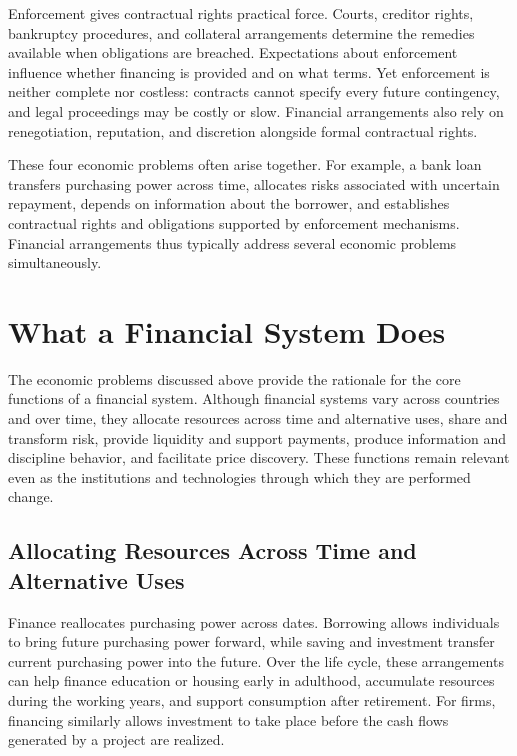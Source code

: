 Enforcement gives contractual rights practical force. Courts, creditor rights, bankruptcy procedures, and collateral arrangements determine the remedies available when obligations are breached. Expectations about enforcement influence whether financing is provided and on what terms. Yet enforcement is neither complete nor costless: contracts cannot specify every future contingency, and legal proceedings may be costly or slow. Financial arrangements also rely on renegotiation, reputation, and discretion alongside formal contractual rights.

These four economic problems often arise together. For example, a bank loan transfers purchasing power across time, allocates risks associated with uncertain repayment, depends on information about the borrower, and establishes contractual rights and obligations supported by enforcement mechanisms. Financial arrangements thus typically address several economic problems simultaneously.

\section{What a Financial System Does}

The economic problems discussed above provide the rationale for the core functions of a financial system. Although financial systems vary across countries and over time, they allocate resources across time and alternative uses, share and transform risk, provide liquidity and support payments, produce information and discipline behavior, and facilitate price discovery. These functions remain relevant even as the institutions and technologies through which they are performed change.

\subsection{Allocating Resources Across Time and Alternative Uses}

Finance reallocates purchasing power across dates. Borrowing allows individuals to bring future purchasing power forward, while saving and investment transfer current purchasing power into the future. Over the life cycle, these arrangements can help finance education or housing early in adulthood, accumulate resources during the working years, and support consumption after retirement. For firms, financing similarly allows investment to take place before the cash flows generated by a project are realized.

